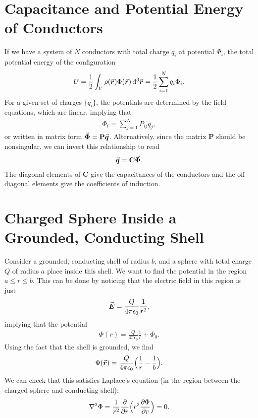 \section{Capacitance and Potential Energy of Conductors}

If we have a system of $N$ conductors with total charge $q_{i}$ at potential $\Phi_{i}$, the total potential energy of the configuration
\begin{eqnarray}
    U = \frac{1}{2} \int_{V} \rho(\va*{r}) \Phi(\va*{r}) \dd[3]{\va*{r}} = \frac{1}{2} \sum_{i=1}^{N} q_{i} \Phi_{i}
.\end{eqnarray}
For a given set of charges $\{ q_{i} \} $, the potentials are determined by the field equations, which are linear, implying that 
\begin{eqnarray}
    \Phi_{i} = \sum_{j=1}^{N} P_{ij} q_{j}
,\end{eqnarray}
or written in matrix form $\va*{\Phi}= \textbf{P} \va*{q}$.
Alternatively, since the matrix $\textbf{P}$ should be nonsingular, we can invert this relationship to read
\begin{eqnarray}
    \va*{q} = \textbf{C} \va*{\Phi}
.\end{eqnarray}
The diagonal elements of $\textbf{C}$ give the capacitances of the conductors and the off diagonal elements give the coefficients of induction.

\section{Charged Sphere Inside a Grounded, Conducting Shell}

Consider a grounded, conducting shell of radius $b$, and a sphere with total charge $Q$ of radius $a$ place inside this shell.
We want to find the potential in the region $a \leq r \leq b$.
This can be done by noticing that the electric field in this region is just
\begin{eqnarray}
    \va*{E} = \frac{Q}{4 \pi \epsilon_0} \frac{1}{r^2}
,\end{eqnarray}
implying that the potential
\begin{eqnarray}
    \Phi(r) = \frac{Q}{4 \pi \epsilon_0} \frac{1}{r} + \Phi_{0}
.\end{eqnarray}
Using the fact that the shell is grounded, we find
\begin{eqnarray}
    \Phi(\va*{r}) = \frac{Q}{4 \pi \epsilon_0} \Big( \frac{1}{r} - \frac{1}{b} \Big)
.\end{eqnarray}
We can check that this satisfies Laplace's equation (in the region between the charged sphere and conducting shell):
\begin{eqnarray}
    \laplacian \Phi = \frac{1}{r^2} \pdv{r} \Big( r^2 \pdv{\Phi}{r} \Big) = 0
.\end{eqnarray}

